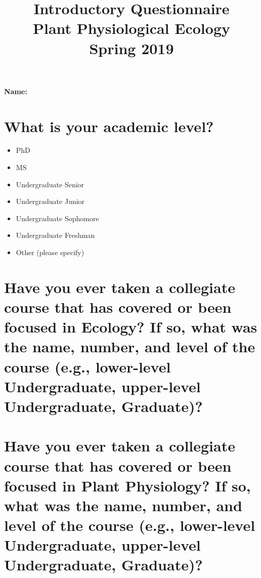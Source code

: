 \documentclass[12pt, notitlepage]{article}   	%
\title{
	\textbf{
		Introductory Questionnaire
	} \\
	\large{Plant Physiological Ecology} \\
	\large{Spring 2019}
}
\date{\vspace{-5ex}}
\def\wl{\par \vspace{\baselineskip}}
\begin{document}
{\selectfont %

\maketitle

\Large{\textbf{Name:} \underline{\hspace{10cm}}}

\section{What is your academic level?}
\begin{itemize}
	\item{\underline{\hspace{1cm}} PhD}
	\item{\underline{\hspace{1cm}} MS}
	\item{\underline{\hspace{1cm}} Undergraduate Senior}
	\item{\underline{\hspace{1cm}} Undergraduate Junior}
	\item{\underline{\hspace{1cm}} Undergraduate Sophomore}
	\item{\underline{\hspace{1cm}} Undergraduate Freshman}
	\item{\underline{\hspace{1cm}} Other (please specify)}
\end{itemize}

\section{Have you ever taken a collegiate course that has covered or been focused in 
Ecology? If so, what was the name, number, and level of the course (e.g., lower-level Undergraduate,
upper-level Undergraduate, Graduate)?}

\wl
\wl
\wl
\wl
\wl
\wl
\wl
\wl

\section{Have you ever taken a collegiate course that has covered or been focused in 
Plant Physiology? If so, what was the name, number, and level of the course 
(e.g., lower-level Undergraduate, upper-level Undergraduate, Graduate)?}

}
\end{document}
